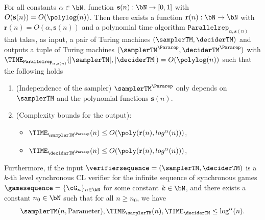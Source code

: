 \begin{proposition} \label{prop:Parallelrepetition}
	For all constants $\alpha \in \bN$, function $\mathbf{s}(n): \bN \rightarrow [0,1]$ with $O(\mathbf{s}(n)) = O(\polylog(n))$. Then there exists a function $\mathbf{r}(n): \bN\rightarrow \bN$ with $\mathbf{r}(n) = O(\alpha ,\mathbf{s}(n))$ and a polynomial time algorithm $\texttt{Parallelrep}_{\alpha, \textbf{s}(n)}$ that takes, as input, a pair of Turing machines $(\samplerTM, \deciderTM)$ and outputs a tuple of Turing machines $(\samplerTM^{\Pararep}, \deciderTM^{\Pararep})$ with $\TIME_{\texttt{Parallelrep}_{\alpha, \mathbf{s}(n)}} (|\samplerTM|, |\deciderTM|) = O(\polylog(n))$ such that the following holds
	\begin{enumerate}
		\item (Independence of the sampler) $\samplerTM^{\Pararep}$ only depends on $\samplerTM$ and the polynomial functions $\mathbf{s}(n)$. 
		\item (Complexity bounds for the output):
		\begin{itemize}
			\item $\TIME_{\samplerTM^{\Pararep} }(n) \leq O(\poly(\mathbf{r}(n), log^{\alpha}(n)))$,
			\item $\TIME_{\deciderTM^{\Pararep} }(n) \leq O(\poly(\mathbf{r}(n), log^{\alpha}(n)))$,
		\end{itemize} 
	\end{enumerate}
	Furthermore, if the input $\verifiersequence = (\samplerTM, \deciderTM)$ is a $k$-th level synchronous CL verifier for the infinite sequence of synchronous games $\gamesequence = \{\cG_n\}_{n \in \bN}$ for some constant $k \in \bN$, and there exists a constant $n_0 \in \bN$ such that for all $n \geq n_0$, we have
	\begin{equation*}
		\samplerTM(n, \text{Parameter}), \TIME_{ \samplerTM }(n),\TIME_{ \deciderTM} \leq \log^{\alpha}(n). 
	\end{equation*}

\end{proposition}
